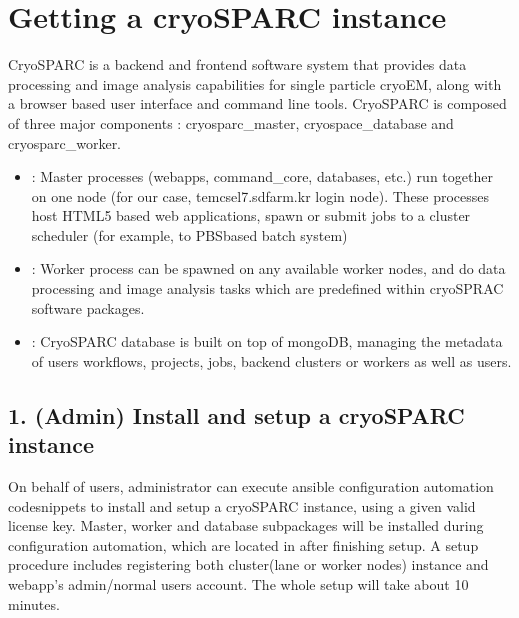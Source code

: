 \documentclass[a4paper,10pt,english]{sphinxmanual}
\begin{document}
\section{Getting a cryoSPARC instance}
\label{\detokenize{cryoSPARC:getting-a-cryosparc-instance}}
\sphinxAtStartPar
CryoSPARC is a backend and frontend software system that provides data processing and image analysis capabilities for single particle cryo\sphinxhyphen{}EM,
along with a browser based user interface and command line tools. CryoSPARC is composed of three major components : cryosparc\_master, cryospace\_database and cryosparc\_worker.
\begin{itemize}
\item {} 
\sphinxAtStartPar
{} : Master processes (webapps, command\_core, databases, etc.) run together on one node (for our case, tem\sphinxhyphen{}cs\sphinxhyphen{}el7.sdfarm.kr login node). These processes host HTML5 based web applications, spawn or submit jobs to a cluster scheduler (for example, to PBS\sphinxhyphen{}based batch system)

\item {} 
\sphinxAtStartPar
{} : Worker process can be spawned on any available worker nodes, and do data processing and image analysis tasks which are pre\sphinxhyphen{}defined within cryoSPRAC software packages.

\item {} 
\sphinxAtStartPar
{} : CryoSPARC database is built on top of mongoDB, managing the metadata of users workflows, projects, jobs, backend clusters or workers as well as users.

\end{itemize}


\subsection{1. (Admin) Install and setup a cryoSPARC instance}
\label{\detokenize{cryoSPARC:admin-install-and-setup-a-cryosparc-instance}}
\sphinxAtStartPar
On behalf of users, administrator can execute ansible configuration automation code\sphinxhyphen{}snippets to install and setup a cryoSPARC instance, using a given valid license key.
Master, worker and database sub\sphinxhyphen{}packages will be installed during configuration automation, which are located in  after finishing setup.
A setup procedure includes registering both cluster(lane or worker nodes) instance and webapp’s admin/normal users account.
The whole setup will take about 10 minutes.
\end{document}
